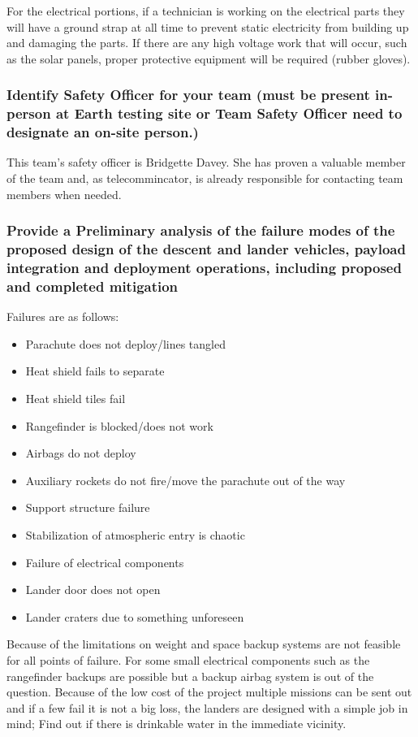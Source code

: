 \documentclass[%
 portrait,
 aapm,
 mph,%
 amsmath,amssymb,
 reprint,%
]{revtex4-2}
\begin{document}
For the electrical portions, if a technician is working on the electrical parts they will have a ground strap at all time to prevent static electricity from building up and damaging the parts.  If there are any high voltage work that will occur, such as the solar panels, proper protective equipment will  be required (rubber gloves).  


\subsubsection{Identify Safety Officer for your team (must be present in-person at
Earth testing site or Team Safety Officer need to designate an on-site person.)}
This team's safety officer is Bridgette Davey. She has proven a valuable member of the team and, as telecommincator, is already responsible for contacting team members when needed. 

\subsubsection{Provide a Preliminary analysis of the failure modes of the proposed design of the descent and lander vehicles, payload integration and deployment
operations, including proposed and completed mitigation}
Failures are as follows:
\begin{itemize}
    \item Parachute does not deploy/lines tangled
    \item Heat shield fails to separate
    \item Heat shield tiles fail
    \item Rangefinder is blocked/does not work
    \item Airbags do not deploy
    \item Auxiliary rockets do not fire/move the parachute out of the way
    \item Support structure failure
    \item Stabilization of atmospheric entry is chaotic
    \item Failure of electrical components
    \item Lander door does not open
    \item Lander craters due to something unforeseen
\end{itemize}
Because of the limitations on weight and space backup systems are not feasible for all points of failure.  For some small electrical components such as the rangefinder backups are possible but a backup airbag system is out of the question.  Because of the low cost of the project multiple missions can be sent out and if a few fail it is not a big loss, the landers are designed with a simple job in mind; Find out if there is drinkable water in the immediate vicinity.  
\end{document}
